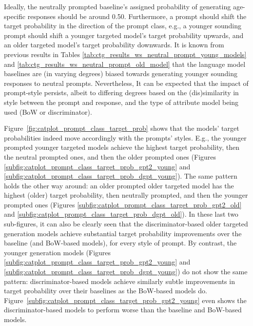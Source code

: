 Ideally, the neutrally prompted baseline's assigned probability of generating age-specific responses should be around 0.50. Furthermore, a prompt should shift the target probability in the direction of the prompt class, e.g., a younger sounding prompt should shift a younger targeted model's target probability upwards, and an older targeted model's target probability downwards. It is known from previous results in Tables \ref{tab:ctg_results_ws_neutral_prompt_young_models} and \ref{tab:ctg_results_ws_neutral_prompt_old_model} that the language model baselines are (in varying degrees) biased towards generating younger sounding responses to neutral prompts. Nevertheless, It can be expected that the impact of prompt-style persists, albeit to differing degrees based on the (dis)similarity in style between the prompt and response, and the type of attribute model being used (BoW or discriminator).


Figure~\ref{fig:catplot_prompt_class_target_prob}
shows that the models' target probabilities indeed move accordingly with the prompts' styles. E.g., the younger prompted younger targeted models achieve the highest target probability, then the neutral prompted ones, and then the older prompted ones (Figures \ref{subfig:catplot_prompt_class_target_prob_gpt2_young} and \ref{subfig:catplot_prompt_class_target_prob_dgpt_young}). The same pattern holds the other way around: an older prompted older targeted model has the highest (older) target probability, then neutrally prompted, and then the younger prompted ones (Figures \ref{subfig:catplot_prompt_class_target_prob_gpt2_old} and \ref{subfig:catplot_prompt_class_target_prob_dgpt_old}). In these last two sub-figures, it can also be clearly seen that the discriminator-based older targeted generation models achieve substantial target probability improvements over the baseline (and BoW-based models), for every style of prompt. By contrast, the younger generation models (Figures \ref{subfig:catplot_prompt_class_target_prob_gpt2_young} and \ref{subfig:catplot_prompt_class_target_prob_dgpt_young}) do not show the same pattern: discriminator-based models achieve similarly subtle improvements in target probability over their baselines as the BoW-based models do. Figure~\ref{subfig:catplot_prompt_class_target_prob_gpt2_young} even shows the discriminator-based models to perform worse than the baseline and BoW-based models.


